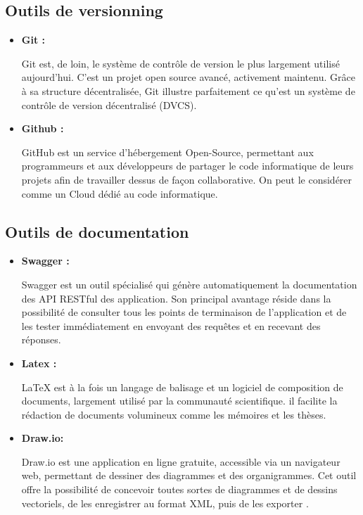     \subsection{Outils de versionning}
    \begin{itemize}
        \item \textbf{Git : }
                    \par Git est, de loin, le système de contrôle de version le plus largement utilisé aujourd'hui. C'est un projet open source avancé, activement maintenu. 
                     Grâce à sa structure décentralisée, Git illustre parfaitement ce qu'est un système de contrôle de version décentralisé (DVCS)\cite{git}.
        \item\textbf{Github :}
                \par GitHub est un service d'hébergement Open-Source, permettant aux programmeurs et aux développeurs de partager le code informatique de leurs projets afin de travailler dessus de façon collaborative. On peut le considérer comme un Cloud dédié au code informatique\cite{github}.
        \end{itemize}
    \subsection{Outils de documentation}
        \begin{itemize}
            \item\textbf{Swagger : }
                        \par Swagger est un outil spécialisé qui génère automatiquement la documentation des API RESTful des application.  
                        Son principal avantage réside dans la possibilité de consulter tous les points de terminaison de l'application et de les tester immédiatement en envoyant des requêtes et en recevant des réponses\cite{swagger}.
            \item\textbf{Latex :}

                    \par LaTeX est à la fois un langage de balisage et un logiciel de composition de documents,
                     largement utilisé par la communauté scientifique.
                      il facilite la rédaction de documents volumineux comme les mémoires et les thèses\cite{latex}.
            \item\textbf{Draw.io:}
                    \par Draw.io est une application en ligne gratuite, accessible via un navigateur web, permettant de dessiner des diagrammes et des organigrammes. 
                    Cet outil offre la possibilité de concevoir toutes sortes de diagrammes et de dessins vectoriels, de les enregistrer au format XML, puis de les exporter \cite{draw}.
            \end{itemize}
